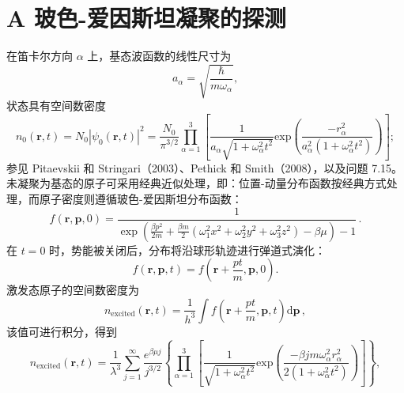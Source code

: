 \section{A 玻色-爱因斯坦凝聚的探测}\label{a-ux73bbux8272-ux7231ux56e0ux65afux5766ux51ddux805aux7684ux63a2ux6d4b}
在笛卡尔方向 \(\alpha\) 上，基态波函数的线性尺寸为
\begin{equation}\tag{7.2.1}\label{eq:7.2.1}
a _ { \alpha } = \sqrt { \frac { \hbar } { m \omega _ { \alpha } } } ,
\end{equation}
状态具有空间数密度
\begin{equation}\tag{7.2.2}\label{eq:7.2.2}
n _ { 0 } ( \pmb { r } , t ) = N _ { 0 } \left| \psi _ { 0 } ( \pmb { r } , t ) \right| ^{2} = \frac { N _ { 0 } } { \pi ^{3 / 2} } \prod _ { \alpha = 1 } ^{3} \left[ \frac { 1 } { a _ { \alpha } \sqrt { 1 + \omega _ { \alpha } ^{2} t ^{2} } } \mathrm { e x p } \left( \frac { - r _ { \alpha } ^{2} } { a _ { \alpha } ^{2} \left( 1 + \omega _ { \alpha } ^{2} t ^{2} \right) } \right) \right] ;
\end{equation}
参见 Pitaevskii 和 Stringari（2003）、Pethick 和 Smith（2008），以及问题 7.15。
未凝聚为基态的原子可采用经典近似处理，即：位置-动量分布函数按经典方式处理，而原子密度则遵循玻色-爱因斯坦分布函数：
\begin{equation}\tag{7.2.3}\label{eq:7.2.3}
f ( \boldsymbol { r } , \boldsymbol { p } , 0 ) = \frac { 1 } { \exp \left( \frac { \beta p ^{2} } { 2 m } + \frac { \beta m } { 2 } \left( \omega _ { 1 } ^{2} x ^{2} + \omega _ { 2 } ^{2} y ^{2} + \omega _ { 3 } ^{2} z ^{2} \right) - \beta \mu \right) - 1 } \, .
\end{equation}
在 \(t=0\) 时，势能被关闭后，分布将沿球形轨迹进行弹道式演化：
\begin{equation}\tag{7.2.4}\label{eq:7.2.4}
f ( \boldsymbol { r } , \boldsymbol { p } , t ) = f \left( \boldsymbol { r } + \frac { p t } { m } , \boldsymbol { p } , 0 \right) .
\end{equation}
激发态原子的空间数密度为
\begin{equation}\tag{7.2.5}\label{eq:7.2.5}
n _ { \mathrm { e x c i t e d } } ( \pmb { r } , t ) = \frac { 1 } { h ^{3} } \int f \left( \pmb { r } + \frac { p t } { m } , \pmb { p } , t \right) \mathrm { d } \pmb { p } \, ,
\end{equation}
该值可进行积分，得到
\begin{equation}\tag{7.2.6}\label{eq:7.2.6}
n _ { \mathrm { e x c i t e d } } ( \pmb { r } , t ) = \frac { 1 } { \lambda ^{3} } \sum _ { j = 1 } ^{\infty} \frac { e ^{\beta \mu j} } { j ^{3 / 2} } \left\{ \prod _ { \alpha = 1 } ^{3} \left[ \frac { 1 } { \sqrt { 1 + \omega _ { \alpha } ^{2} t ^{2} } } \mathrm { e x p } \left( \frac { - \beta j m \omega _ { \alpha } ^{2} r _ { \alpha } ^{2} } { 2 \left( 1 + \omega _ { \alpha } ^{2} t ^{2} \right) } \right) \right] \right\} ,
\end{equation}
